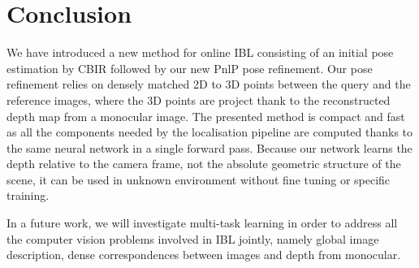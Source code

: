 \section{Conclusion}
\label{seq:conclusion}

We have introduced a new method for online IBL consisting of an initial pose estimation by CBIR followed by our new PnlP pose refinement. Our pose refinement relies on densely matched 2D to 3D points between the query and the reference images, where the 3D points are project thank to the reconstructed depth map from a monocular image. The presented method is compact and fast as all the components needed by the localisation pipeline are computed thanks to the same neural network in a single forward pass. Because our network learns the depth relative to the camera frame, not the absolute geometric structure of the scene, it can be used in unknown environment without fine tuning or specific training. 

In a future work, we will investigate multi-task learning in order to address all the computer vision problems involved in IBL jointly, namely global image description, dense correspondences between images and depth from monocular.